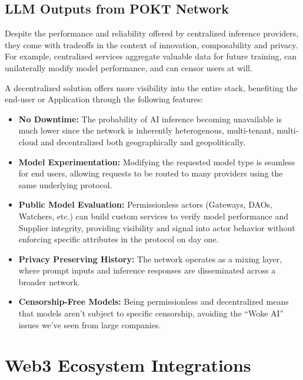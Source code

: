 \documentclass[conference,compsoc]{IEEEtran}
\begin{document}
\subsection{LLM Outputs from POKT Network}

Despite the performance and reliability offered by centralized inference providers, they come with tradeoffs in the context of innovation, composability and privacy. For example, centralized services aggregate valuable data for future training, can unilaterally modify model performance, and can censor users at will.

A decentralized solution offers more visibility into the entire stack, benefiting the end-user or Application through the following features:

\begin{itemize}
    \item \textbf{No Downtime:} The probability of AI inference becoming unavailable is much lower since the network is inherently heterogenous, multi-tenant, multi-cloud and decentralized both geographically and geopolitically.

    \item \textbf{Model Experimentation: } Modifying the requested model type is seamless for end users, allowing requests to be routed to many providers using the same underlying protocol.

    \item \textbf{Public Model Evaluation:} Permissionless actors (Gateways, DAOs, Watchers, etc.) can build custom services to verify model performance and Supplier integrity, providing visibility and signal into actor behavior without enforcing specific attributes in the protocol on day one.

    \item \textbf{Privacy Preserving History:} The network operates as a mixing layer, where prompt inputs and inference responses are disseminated across a broader network.
    
    \item \textbf{Censorship-Free Models:}  Being permissionless and decentralized means that models aren’t subject to specific censorship, avoiding the “Woke AI”~\cite{thefpGooglesWoke} issues we’ve seen from large companies.
\end{itemize}

\section{Web3 Ecosystem Integrations}
\end{document}
